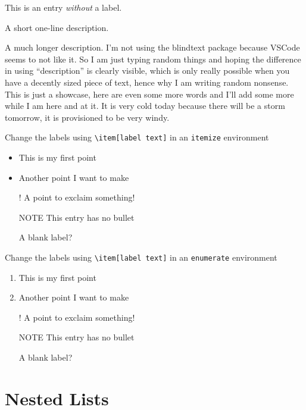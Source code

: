 \documentclass{article}
\begin{document}
\begin{description}
    \item This is an entry \textit{without} a label.
    \item[Something short] A short one-line description.
    \item[Something long] A much longer description. I'm not using the blindtext package
    because VSCode seems to not like it. So I am just typing random things and hoping
    the difference in using ``description'' is clearly visible, which is only really
    possible when you have a decently sized piece of text, hence why I am writing random
    nonsense. This is just a showcase, here are even some more words and I'll add some
    more while I am here and at it. It is very cold today because there will be a storm
    tomorrow, it is provisioned to be very windy.
 \end{description}


Change the labels using \verb|\item[label text]| in an \texttt{itemize} environment
\begin{itemize}
  \item This is my first point
  \item Another point I want to make 
  \item[!] A point to exclaim something!
  \item[NOTE] This entry has no bullet
  \item[] A blank label?
\end{itemize}

\vspace{10pt}

Change the labels using \verb|\item[label text]| in an \texttt{enumerate} environment
\begin{enumerate}
  \item This is my first point
  \item Another point I want to make 
  \item[!] A point to exclaim something!
  \item[NOTE] This entry has no bullet
  \item[] A blank label?
\end{enumerate}

\section*{Nested Lists}
\end{document}
